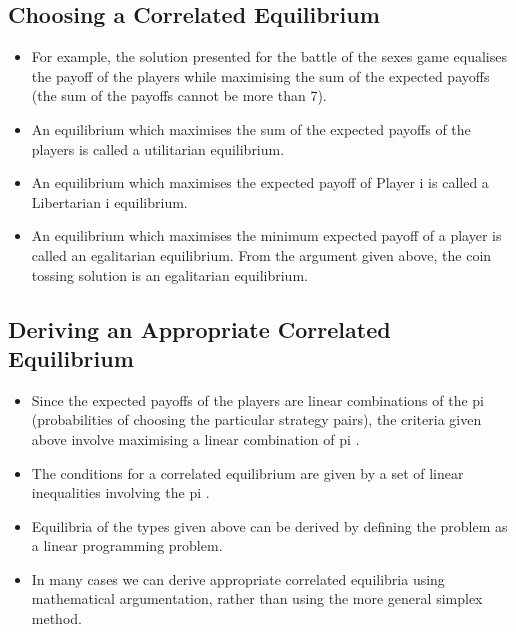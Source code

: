 \documentclass[]{report}
\begin{document}

\subsection{Choosing a Correlated Equilibrium}
\begin{itemize}
	\item For example, the solution presented for the battle of the sexes
	game equalises the payoff of the players while maximising the sum
	of the expected payoffs (the sum of the payoffs cannot be more
	than 7).
	\item	An equilibrium which maximises the sum of the expected payoffs of
	the players is called a utilitarian equilibrium.
	\item An equilibrium which maximises the expected payoff of Player i is
	called a Libertarian i equilibrium.
	\item	An equilibrium which maximises the minimum expected payoff of a
	player is called an egalitarian equilibrium. From the argument
	given above, the coin tossing solution is an egalitarian equilibrium.

\end{itemize}

\subsection{Deriving an Appropriate Correlated Equilibrium}
\begin{itemize}
	\item Since the expected payoffs of the players are linear combinations of
	the pi (probabilities of choosing the particular strategy pairs), the
	criteria given above involve maximising a linear combination of pi
	.
	\item The conditions for a correlated equilibrium are given by a set of
	linear inequalities involving the pi
	.
	\item Equilibria of the types given above can be derived by defining the
	problem as a linear programming problem.
	\item In many cases we can derive appropriate correlated equilibria using
	mathematical argumentation, rather than using the more general
	simplex method.
\end{itemize}

\end{document}

